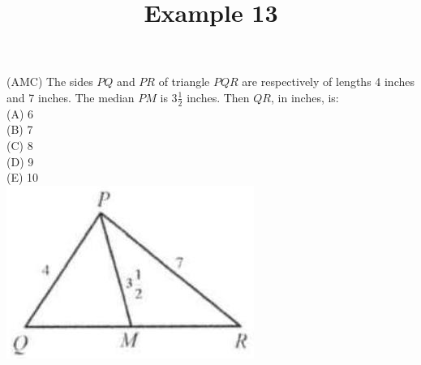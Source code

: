 \documentclass{article}
\title{Example 13}
\date{}
\begin{document}
\maketitle

(AMC) The sides \(P Q\) and \(P R\) of triangle \(P Q R\) are respectively of lengths 4 inches and 7 inches. The median \(P M\) is \(3 \frac{1}{2}\) inches. Then \(Q R\), in inches, is:\\
(A) 6\\
(B) 7\\
(C) 8\\
(D) 9\\
(E) 10\\
\centering
\includegraphics[width=\textwidth]{images/problem_image_1.jpg}
\end{document}
